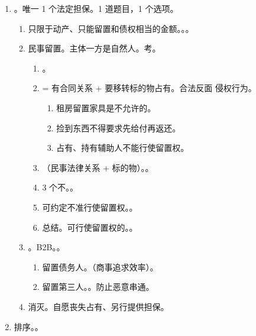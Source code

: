 \begin{enumerate}
\begin{enumerate}
          \item 转质。征得/未征得同意 \yjt 承诺转质/责任转质 \yjt 本质是有权处分/无权处分，适用善意取得。
        \end{enumerate}
  \item {}。唯一 1 个法定担保。1 道题目，1 个选项。
        \begin{enumerate}
          \item 只限于动产、只能留置和债权相当的金额。。。
          \item 民事留置。主体一方是自然人。考。
                \begin{enumerate}
                  \item {}。
                  \item {} = 有合同关系 + 要移转标的物占有。合法反面 \yjt 侵权行为。
                        \begin{enumerate}
                          \item 租房留置家具是不允许的。
                          \item 捡到东西不得要求先给付再返还。
                          \item 占有、持有辅助人不能行使留置权。
                        \end{enumerate}
                  \item {}（民事法律关系 + 标的物）。。
                  \item 3 个不。。
                  \item 可约定不准行使留置权。。
                  \item 总结。可行使留置权的。。
                \end{enumerate}
          \item {}。B2B。。
                \begin{enumerate}
                  \item 留置债务人。（商事追求效率）。
                  \item 留置第三人。。防止恶意串通。
                \end{enumerate}
          \item 消灭。自愿丧失占有、另行提供担保。
        \end{enumerate}
  \item 排序。。
\end{enumerate}
